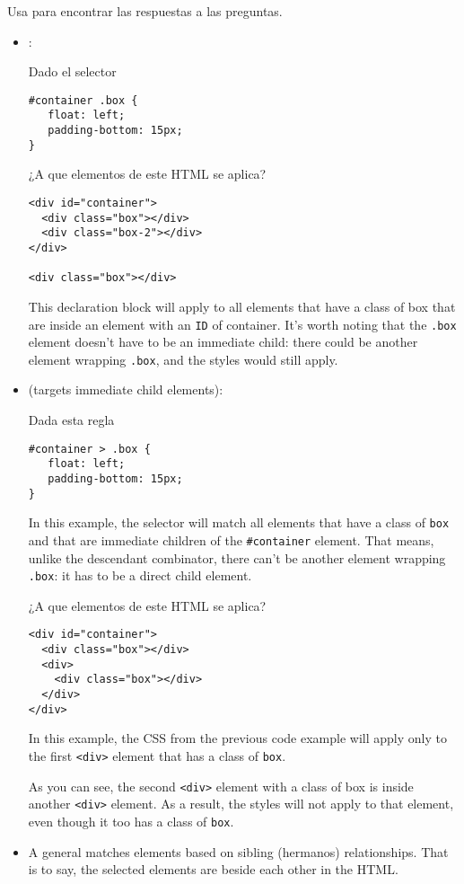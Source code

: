 \begin{exercise}
Usa 
para encontrar las respuestas a las preguntas. 
\begin{itemize}
\item {}:

Dado el selector
\begin{verbatim}
#container .box {
   float: left;
   padding-bottom: 15px;
}
\end{verbatim}
¿A que elementos de este HTML se aplica?
\begin{verbatim}
<div id="container">
  <div class="box"></div>
  <div class="box-2"></div>
</div>

<div class="box"></div>
\end{verbatim}
This declaration block will apply to all elements that have a class of box that are inside an element with an \verb|ID| of container. It's worth noting that the \verb|.box|
element doesn't have to be an immediate
child: there could be another element wrapping \verb|.box|, 
and the styles would still apply.
\item {} (targets immediate child elements):

Dada esta regla
\begin{verbatim}
#container > .box {
   float: left;
   padding-bottom: 15px;
}
\end{verbatim}
In this example, the selector will match all elements that have a class of 
\verb|box| and that are immediate children of the 
\verb|#container| element. 
That means, unlike the descendant combinator, there can't be
another element wrapping \verb|.box|: 
it has to be a direct child element.


¿A que elementos de este HTML se aplica?
\begin{verbatim}
<div id="container">
  <div class="box"></div>
  <div>
    <div class="box"></div>
  </div>
</div>
\end{verbatim}

In this example, the CSS from the previous code example will apply only to the first 
\verb|<div>| element that has a class of \verb|box|. 

As you can see, the second \verb|<div>|
element with a class of box is inside
another \verb|<div>| element. 
As a result, the styles will not apply to that element, even though it too has a class of 
\verb|box|.

\item A general  matches elements based on sibling (hermanos)
relationships. That is to say, the selected elements are beside each other in the HTML.


\end{itemize}
\end{exercise}
